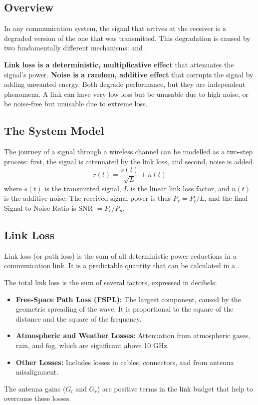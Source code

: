 \subsection{Overview}

In any communication system, the signal that arrives at the receiver is a degraded version of the one that was transmitted. This degradation is caused by two fundamentally different mechanisms:  and .

\begin{keyconcept}
    \textbf{Link loss is a deterministic, multiplicative effect} that attenuates the signal's power. \textbf{Noise is a random, additive effect} that corrupts the signal by adding unwanted energy. Both degrade performance, but they are independent phenomena. A link can have very low loss but be unusable due to high noise, or be noise-free but unusable due to extreme loss.
\end{keyconcept}


\subsection{The System Model}

The journey of a signal through a wireless channel can be modelled as a two-step process: first, the signal is attenuated by the link loss, and second, noise is added.
\begin{equation}
    r(t) = \frac{s(t)}{\sqrt{L}} + n(t)
\end{equation}
where $s(t)$ is the transmitted signal, $L$ is the linear link loss factor, and $n(t)$ is the additive noise. The received signal power is thus $P_r = P_t / L$, and the final Signal-to-Noise Ratio is SNR $= P_r / P_n$.


\subsection{Link Loss}

Link loss (or path loss) is the sum of all deterministic power reductions in a communication link. It is a predictable quantity that can be calculated in a .

The total link loss is the sum of several factors, expressed in decibels:
\begin{itemize}
    \item \textbf{Free-Space Path Loss (FSPL):} The largest component, caused by the geometric spreading of the wave. It is proportional to the square of the distance and the square of the frequency.
    \item \textbf{Atmospheric and Weather Losses:} Attenuation from atmospheric gases, rain, and fog, which are significant above 10 GHz.
    \item \textbf{Other Losses:} Includes losses in cables, connectors, and from antenna misalignment.
\end{itemize}
The antenna gains ($G_t$ and $G_r$) are positive terms in the link budget that help to overcome these losses.


